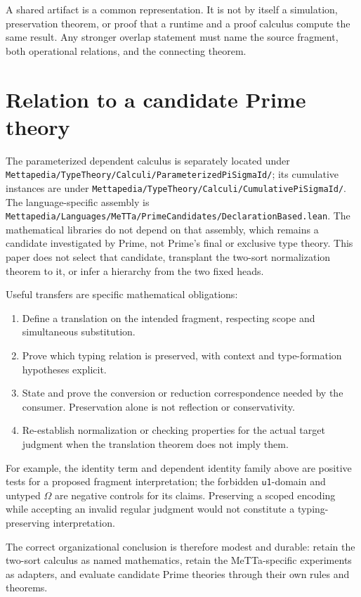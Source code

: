 \documentclass[11pt]{article}
\newcommand{\code}[1]{\nolinkurl{#1}}
\newcommand{\uO}{\mathsf{u1}}
\begin{document}
A shared artifact is a common representation. It is not by itself a
simulation, preservation theorem, or proof that a runtime and a proof
calculus compute the same result. Any stronger overlap statement must name
the source fragment, both operational relations, and the connecting theorem.

\section{Relation to a candidate Prime theory}

The parameterized dependent calculus is separately located under
\code{Mettapedia/TypeTheory/Calculi/ParameterizedPiSigmaId/}; its cumulative
instances are under \code{Mettapedia/TypeTheory/Calculi/CumulativePiSigmaId/}.
The language-specific assembly is
\code{Mettapedia/Languages/MeTTa/PrimeCandidates/DeclarationBased.lean}.
The mathematical libraries do not depend on that assembly, which remains a
candidate investigated by Prime, not Prime's final or exclusive type theory.
This paper does not select that candidate, transplant the two-sort
normalization theorem to it, or infer a hierarchy from the two fixed heads.

Useful transfers are specific mathematical obligations:
\begin{enumerate}
  \item Define a translation on the intended fragment, respecting scope and
  simultaneous substitution.
  \item Prove which typing relation is preserved, with context and
  type-formation hypotheses explicit.
  \item State and prove the conversion or reduction correspondence needed
  by the consumer. Preservation alone is not reflection or conservativity.
  \item Re-establish normalization or checking properties for the actual
  target judgment when the translation theorem does not imply them.
\end{enumerate}
For example, the identity term and dependent identity family above are
positive tests for a proposed fragment interpretation; the forbidden
$\uO$-domain and untyped $\Omega$ are negative controls for its claims.
Preserving a scoped encoding while accepting an invalid regular judgment
would not constitute a typing-preserving interpretation.

The correct organizational conclusion is therefore modest and durable:
retain the two-sort calculus as named mathematics, retain the MeTTa-specific
experiments as adapters, and evaluate candidate Prime theories through their
own rules and theorems.
\end{document}
